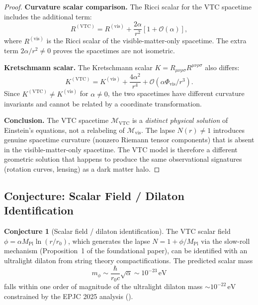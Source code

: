 \documentclass[11pt,a4paper]{article}
\theoremstyle{definition}
\newtheorem{conjecture}[theorem]{Conjecture}
\newcommand{\vis}{\mathrm{vis}}
\newcommand{\VTC}{\mathrm{VTC}}
\newcommand{\Pl}{\mathrm{Pl}}
\begin{document}
\begin{proof}
\textbf{Curvature scalar comparison.} The Ricci scalar for the VTC spacetime includes the additional term:
\begin{equation}
R^{(\VTC)} = R^{(\vis)} + \frac{2\alpha}{r^2}\left[1 + \mathcal{O}(\alpha)\right],
\end{equation}
where $R^{(\vis)}$ is the Ricci scalar of the visible-matter-only spacetime. The extra term $2\alpha/r^2 \neq 0$ proves the spacetimes are not isometric.

\textbf{Kretschmann scalar.} The Kretschmann scalar $K = R_{\mu\nu\rho\sigma}R^{\mu\nu\rho\sigma}$ also differs:
\begin{equation}
K^{(\VTC)} = K^{(\vis)} + \frac{4\alpha^2}{r^4} + \mathcal{O}(\alpha\Phi_{\vis}/r^3).
\end{equation}
Since $K^{(\VTC)} \neq K^{(\vis)}$ for $\alpha \neq 0$, the two spacetimes have different curvature invariants and cannot be related by a coordinate transformation.

\textbf{Conclusion.} The VTC spacetime $\mathcal{M}_{\VTC}$ is a \textit{distinct physical solution} of Einstein's equations, not a relabeling of $\mathcal{M}_{\vis}$. The lapse $N(r) \neq 1$ introduces genuine spacetime curvature (nonzero Riemann tensor components) that is absent in the visible-matter-only spacetime. The VTC model is therefore a different geometric solution that happens to produce the same observational signatures (rotation curves, lensing) as a dark matter halo.
\end{proof}

\subsection{Conjecture: Scalar Field / Dilaton Identification}
\label{conj:dilaton}

\begin{conjecture}[Scalar field / dilaton identification]
The VTC scalar field $\phi = \alpha M_{\Pl}\ln(r/r_0)$, which generates the lapse $N = 1 + \phi/M_{\Pl}$ via the slow-roll mechanism (Proposition~1 of the foundational paper), can be identified with an ultralight dilaton from string theory compactifications. The predicted scalar mass
\begin{equation}
m_\phi \sim \frac{\hbar}{r_0 c}\sqrt{\alpha} \sim 10^{-23}\,\mathrm{eV}
\end{equation}
falls within one order of magnitude of the ultralight dilaton mass $\sim 10^{-22}\,\mathrm{eV}$ constrained by the EPJC 2025 analysis (\cite{EPJC2025}).
\end{conjecture}
\end{document}
